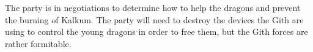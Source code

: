 The party is in negotiations to determine how to help the dragons and prevent the burning of Kalkum.
The party will need to destroy the devices the Gith are using to control the young dragons in order to free them, but the Gith forces are rather formitable.
